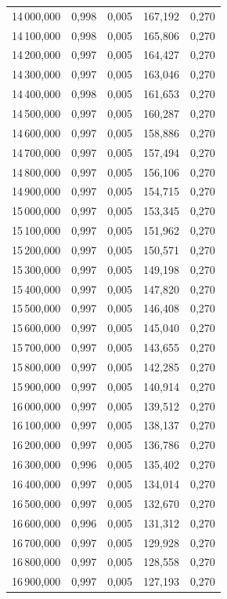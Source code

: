 \begin{longtable}{rrrrr}
14\,000,000 & 0,998 & 0,005 & 167,192 & 0,270\\
14\,100,000 & 0,998 & 0,005 & 165,806 & 0,270\\
14\,200,000 & 0,997 & 0,005 & 164,427 & 0,270\\
14\,300,000 & 0,997 & 0,005 & 163,046 & 0,270\\
14\,400,000 & 0,998 & 0,005 & 161,653 & 0,270\\
14\,500,000 & 0,997 & 0,005 & 160,287 & 0,270\\
14\,600,000 & 0,997 & 0,005 & 158,886 & 0,270\\
14\,700,000 & 0,997 & 0,005 & 157,494 & 0,270\\
14\,800,000 & 0,997 & 0,005 & 156,106 & 0,270\\
14\,900,000 & 0,997 & 0,005 & 154,715 & 0,270\\
15\,000,000 & 0,997 & 0,005 & 153,345 & 0,270\\
15\,100,000 & 0,997 & 0,005 & 151,962 & 0,270\\
15\,200,000 & 0,997 & 0,005 & 150,571 & 0,270\\
15\,300,000 & 0,997 & 0,005 & 149,198 & 0,270\\
15\,400,000 & 0,997 & 0,005 & 147,820 & 0,270\\
15\,500,000 & 0,997 & 0,005 & 146,408 & 0,270\\
15\,600,000 & 0,997 & 0,005 & 145,040 & 0,270\\
15\,700,000 & 0,997 & 0,005 & 143,655 & 0,270\\
15\,800,000 & 0,997 & 0,005 & 142,285 & 0,270\\
15\,900,000 & 0,997 & 0,005 & 140,914 & 0,270\\
16\,000,000 & 0,997 & 0,005 & 139,512 & 0,270\\
16\,100,000 & 0,997 & 0,005 & 138,137 & 0,270\\
16\,200,000 & 0,997 & 0,005 & 136,786 & 0,270\\
16\,300,000 & 0,996 & 0,005 & 135,402 & 0,270\\
16\,400,000 & 0,997 & 0,005 & 134,014 & 0,270\\
16\,500,000 & 0,997 & 0,005 & 132,670 & 0,270\\
16\,600,000 & 0,996 & 0,005 & 131,312 & 0,270\\
16\,700,000 & 0,997 & 0,005 & 129,928 & 0,270\\
16\,800,000 & 0,997 & 0,005 & 128,558 & 0,270\\
16\,900,000 & 0,997 & 0,005 & 127,193 & 0,270\\

\end{longtable}
